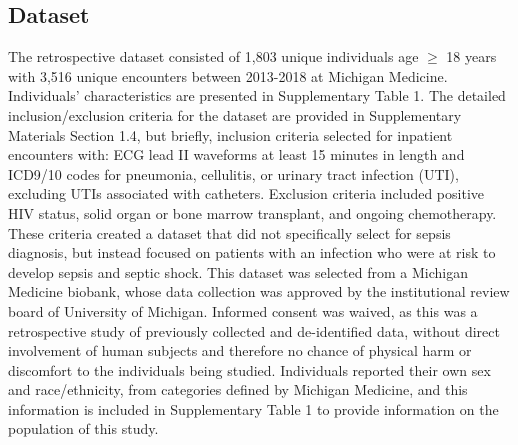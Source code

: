 


\subsection{Dataset} \label{sec:methods_dataset}

The retrospective dataset consisted of 1,803 unique individuals age $\geq$ 18 years with 3,516 unique encounters between 2013-2018 at Michigan Medicine. Individuals' characteristics are presented in Supplementary Table 1. The detailed inclusion/exclusion criteria for the dataset are provided in Supplementary Materials Section 1.4, but briefly, inclusion criteria selected for inpatient encounters with: ECG lead II waveforms at least 15 minutes in length and ICD9/10 codes for pneumonia, cellulitis, or urinary tract infection (UTI), excluding UTIs associated with catheters. Exclusion criteria included positive HIV status, solid organ or bone marrow transplant, and ongoing chemotherapy. These criteria created a dataset that did not specifically select for sepsis diagnosis, but instead focused on patients with an infection who were at risk to develop sepsis and septic shock. This dataset was selected from a Michigan Medicine biobank, whose data collection was approved by the institutional review board of University of Michigan. Informed consent was waived, as this was a retrospective study of previously collected and de-identified data, without direct involvement of human subjects and therefore no chance of physical harm or discomfort to the individuals being studied. Individuals reported their own sex and race/ethnicity, from categories defined by Michigan Medicine, and this information is included in Supplementary Table 1 to provide information on the population of this study.

